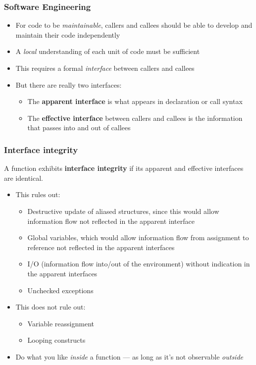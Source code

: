 \documentclass[12pt]{beamer}
\begin{document}
\begin{frame}
\frametitle{Software Engineering}
\begin{itemize}
\item For code to be \emph{maintainable}, callers and callees should be
  able to develop and maintain their code independently
\item A \emph{local} understanding of each unit of code must be sufficient
\item This requires a formal \emph{interface} between callers and callees
\item But there are really two interfaces:
  \begin{itemize}
  \item The \textbf{apparent interface} is what appears in declaration
    or call syntax
  \item The \textbf{effective interface} between callers and
    callees is the information that passes into and out of callees
  \end{itemize}
\end{itemize}

\end{frame}


\begin{frame}
\frametitle{Interface integrity}

A function exhibits \textbf{interface integrity} if its apparent and
effective interfaces are identical.

\begin{itemize}
\item This rules out:
  \begin{itemize}
  \item Destructive update of aliased structures, since this would allow
    information flow not reflected in the apparent interface
  \item Global variables, which would allow information flow from
    assignment to reference not reflected in the apparent interfaces
  \item I/O (information flow into/out of the environment) without
    indication in the apparent interfaces
  \item Unchecked exceptions
  \end{itemize}
\item This does not rule out:
  \begin{itemize}
  \item Variable reassignment
  \item Looping constructs
  \end{itemize}
\item Do what you like \emph{inside} a function --- as long as it's not
  observable \emph{outside}
\end{itemize}

\end{frame}
\end{document}
